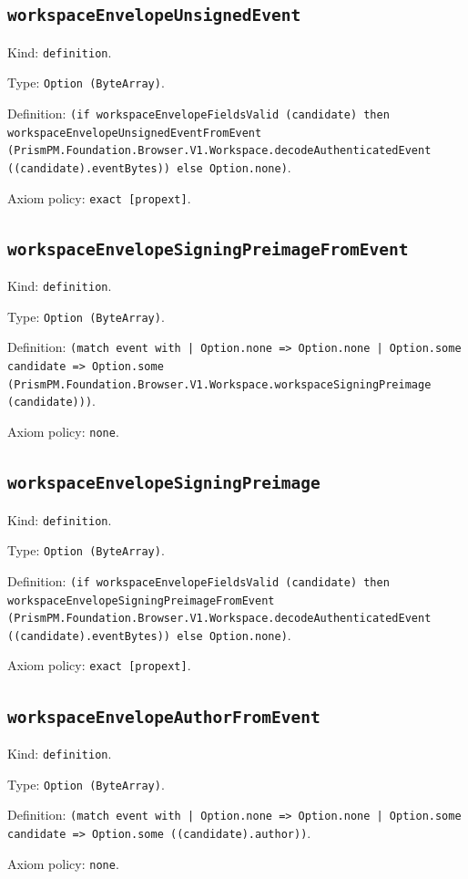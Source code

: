 \documentclass[11pt]{article}
\begin{document}
\subsection*{\texttt{workspaceEnvelopeUnsignedEvent}}
\noindent Kind: \texttt{definition}.\par
\noindent Type: \texttt{Option (ByteArray)}.\par
\noindent Definition: \texttt{(if workspaceEnvelopeFieldsValid (candidate) then workspaceEnvelopeUnsignedEventFromEvent (PrismPM.Foundation.Browser.V1.Workspace.decodeAuthenticatedEvent ((candidate).eventBytes)) else Option.none)}.\par
\noindent Axiom policy: \texttt{exact [propext]}.\par
\subsection*{\texttt{workspaceEnvelopeSigningPreimageFromEvent}}
\noindent Kind: \texttt{definition}.\par
\noindent Type: \texttt{Option (ByteArray)}.\par
\noindent Definition: \texttt{(match event with | Option.none => Option.none | Option.some candidate => Option.some (PrismPM.Foundation.Browser.V1.Workspace.workspaceSigningPreimage (candidate)))}.\par
\noindent Axiom policy: \texttt{none}.\par
\subsection*{\texttt{workspaceEnvelopeSigningPreimage}}
\noindent Kind: \texttt{definition}.\par
\noindent Type: \texttt{Option (ByteArray)}.\par
\noindent Definition: \texttt{(if workspaceEnvelopeFieldsValid (candidate) then workspaceEnvelopeSigningPreimageFromEvent (PrismPM.Foundation.Browser.V1.Workspace.decodeAuthenticatedEvent ((candidate).eventBytes)) else Option.none)}.\par
\noindent Axiom policy: \texttt{exact [propext]}.\par
\subsection*{\texttt{workspaceEnvelopeAuthorFromEvent}}
\noindent Kind: \texttt{definition}.\par
\noindent Type: \texttt{Option (ByteArray)}.\par
\noindent Definition: \texttt{(match event with | Option.none => Option.none | Option.some candidate => Option.some ((candidate).author))}.\par
\noindent Axiom policy: \texttt{none}.\par
\end{document}
